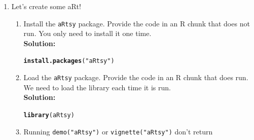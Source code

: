 \documentclass{article}\usepackage[]{graphicx}\usepackage[]{xcolor}
\makeatletter
\newcommand{\hlsng}[1]{\textcolor[rgb]{0.192,0.494,0.8}{#1}}%
\newcommand{\hldef}[1]{\textcolor[rgb]{0.345,0.345,0.345}{#1}}%
\newcommand{\hlkwd}[1]{\textcolor[rgb]{0.737,0.353,0.396}{\textbf{#1}}}%
\newenvironment{kframe}{%
 \def\at@end@of@kframe{}%
 \ifinner\ifhmode%
  \def\at@end@of@kframe{\end{minipage}}%
  \begin{minipage}{\columnwidth}%
 \fi\fi%
 \def\FrameCommand##1{\hskip\@totalleftmargin \hskip-\fboxsep
 \colorbox{shadecolor}{##1}\hskip-\fboxsep
     \hskip-\linewidth \hskip-\@totalleftmargin \hskip\columnwidth}%
 \MakeFramed {\advance\hsize-\width
   \@totalleftmargin\z@ \linewidth\hsize
   \@setminipage}}%
 {\par\unskip\endMakeFramed%
 \at@end@of@kframe}
\newenvironment{knitrout}{}{} %
\makeatother
\begin{document}
\begin{enumerate}
\item Let's create some aRt! 
\begin{enumerate}
  \item Install the \texttt{aRtsy} package. Provide the code in an R chunk   that does 
  not run. You only need to install it one time.\\
\textbf{Solution:}
\begin{knitrout}\scriptsize
{}\color{fgcolor}\begin{kframe}
\begin{alltt}
\hlkwd{install.packages}\hldef{(}\hlsng{"aRtsy"}\hldef{)}
\end{alltt}
\end{kframe}
\end{knitrout}
  \item Load the \texttt{aRtsy} package. Provide the code in an R chunk that does run. 
  We need to load the library each time it is run.\\
\textbf{Solution:}
\begin{knitrout}\scriptsize
{}\color{fgcolor}\begin{kframe}
\begin{alltt}
\hlkwd{library}\hldef{(aRtsy)}
\end{alltt}
\end{kframe}
\end{knitrout}
 \item Running \texttt{demo("aRtsy")} or \texttt{vignette("aRtsy")} don't return 

\end{enumerate}
\end{enumerate}
\end{document}
